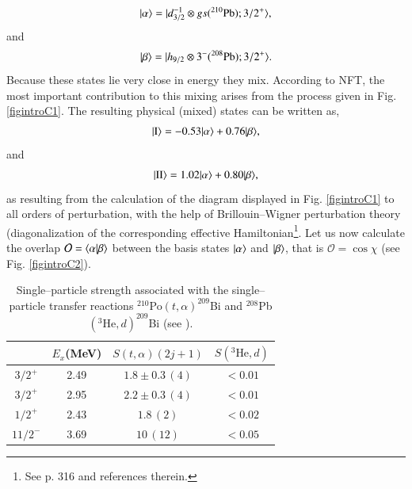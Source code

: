 \begin{align}\label{eqintroC1}
|{\alpha} \rangle=|{d_{3/2}^{-1}\otimes gs (^{210}\text{Pb});3/2^+} \rangle,
\end{align}
and 
\begin{align}\label{eqintroC2}
|{\beta} \rangle=|{h_{9/2}\otimes 3^- (^{208}\text{Pb});3/2^+} \rangle.
\end{align}
Because these states lie very close in energy they mix. According to NFT, the most important contribution to this mixing arises from the process given in Fig. \ref{figintroC1}. The resulting physical (mixed) states can be  written as,
\begin{align}\label{eqintroC3}
|{\text{I}} \rangle=-0.53 |{\alpha} \rangle + 0.76 |{\beta} \rangle,
\end{align}
and 
\begin{align}\label{eqintroC4}
|{\text{II}} \rangle=1.02 |{\alpha} \rangle + 0.80 |{\beta} \rangle,
\end{align}
as resulting from the calculation of the diagram displayed in Fig. \ref{figintroC1} to all orders of perturbation, with the help of Brillouin--Wigner perturbation theory (diagonalization of the corresponding effective Hamiltonian\footnote{See p. 316 \cite{Bortignon:77} and references therein.}. Let us now calculate the overlap $\mathcal O=\langle {\alpha|\beta} \rangle$ between the basis states $|{\alpha} \rangle$ and $|{\beta} \rangle$, that is $\mathcal O=\cos\chi$ (see Fig. \ref{figintroC2}).   
\begin{table}
\begin{tabular}{|c|c|c|c|}
\hline 
 & $E_x$(MeV) & $S(t,\alpha)(2j+1)$ & $S(^3\text{He},d)$ \\
 \hline 
$3/2^+$ & 2.49 & $1.8\pm0.3\,(4)$  & $<0.01$  \\ 
$3/2^+$ & 2.95 & $2.2\pm0.3\,(4)$  & $<0.01$ \\ 
 $1/2^+$& 2.43 &  $1.8\,(2)$& $<0.02$ \\ 
 $11/2^-$& 3.69 & $10\,(12)$ &  $<0.05$\\ 
 \hline
\end{tabular}\caption{Single--particle strength associated with the single--particle transfer reactions  $^{210}$Po$(t,\alpha)^{209}$Bi and $^{208}$Pb$(^3\text{He},d)^{209}$Bi (see \cite{Bortignon:77}).}\label{tabintroC1}
\end{table}
